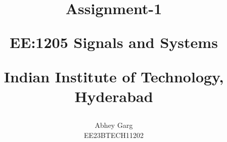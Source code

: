 \documentclass[journal,12pt,twocolumn]{IEEEtran}
\theoremstyle{remark}
\begin{document}
%




\vspace{3cm}

\title{
Assignment-1 

\large{EE:1205 Signals and Systems}

Indian Institute of Technology, Hyderabad
}
\author{Abhey Garg

EE23BTECH11202
}	


%
%
%

% 
%



% 
\end{document}
